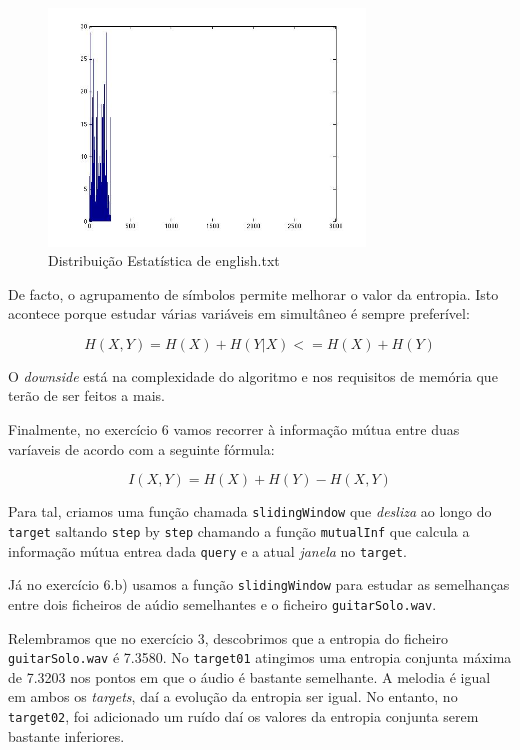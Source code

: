 \documentclass[12pt]{article}
\begin{document}
  \begin{figure}[H]
    \centering
      \includegraphics[width=0.75\textwidth]{ex5english}
    \caption{Distribuição Estatística de english.txt}
  \end{figure}

  De facto, o agrupamento de símbolos permite melhorar o valor
  da entropia. Isto acontece porque estudar várias variáveis em simultâneo
  é sempre preferível:

  $$ H(X ,Y) = H(X)+ H(Y|X)<= H(X)+ H(Y) $$

  O \textit{downside} está na complexidade do algoritmo e nos requisitos
  de memória que terão de ser feitos a mais.

  Finalmente, no exercício 6 vamos recorrer à informação mútua entre duas
  varíaveis de acordo com a seguinte fórmula:

  $$
    I(X,Y) = H(X) + H(Y) - H(X,Y)
  $$

  Para tal, criamos uma função chamada \texttt{slidingWindow} que
  \textit{desliza} ao longo do \texttt{target} saltando \texttt{step}
  by \texttt{step} chamando a função \texttt{mutualInf} que calcula a informação
  mútua entrea dada \texttt{query} e a atual \textit{janela} no \texttt{target}.

  Já no exercício 6.b) usamos a função \texttt{slidingWindow} para
  estudar as semelhanças entre dois ficheiros de aúdio semelhantes e
  o ficheiro \texttt{guitarSolo.wav}.

  Relembramos que no exercício 3, descobrimos que a entropia do ficheiro
  \texttt{guitarSolo.wav} é 7.3580. No \texttt{target01}
  atingimos uma entropia conjunta máxima de 7.3203 nos pontos em que
  o áudio é bastante semelhante. A melodia é igual em ambos os \textit{targets},
  daí a evolução da entropia ser igual. No entanto, no \texttt{target02},
  foi adicionado um ruído daí os valores da entropia conjunta serem
  bastante inferiores.
\end{document}
